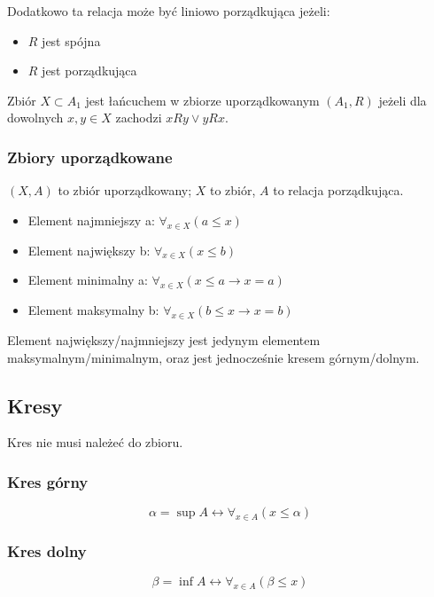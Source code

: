 \documentclass{../notatki}
\begin{document}
Dodatkowo ta relacja może być liniowo porządkująca jeżeli:

\begin{itemize}
  \item $R$ jest spójna
  \item $R$ jest porządkująca
\end{itemize}

Zbiór $X \subset A_1$ jest łańcuchem w zbiorze uporządkowanym $(A_1, R)$ jeżeli
dla dowolnych $x, y \in X$ zachodzi $xRy \lor yRx$.

\subsubsection{Zbiory uporządkowane}

$(X, A)$ to zbiór uporządkowany; $X$ to zbiór, $A$ to relacja porządkująca.

\begin{itemize}
  \item Element najmniejszy a: $\forall_{x \in X}(a \le x)$
  \item Element największy b: $\forall_{x \in X}(x \le b)$
  \item Element minimalny a: $\forall_{x \in X}(x \le a \rightarrow x = a)$
  \item Element maksymalny b: $\forall_{x \in X}(b \le x \rightarrow x = b)$
\end{itemize}

Element największy/najmniejszy jest jedynym elementem maksymalnym/minimalnym,
oraz jest jednocześnie kresem górnym/dolnym.

\subsection{Kresy}

Kres nie musi należeć do zbioru.

\subsubsection{Kres górny}

$$
\alpha = \sup A \leftrightarrow \forall_{x \in A}(x \le \alpha)
$$

\subsubsection{Kres dolny}

$$
\beta = \inf A \leftrightarrow \forall_{x \in A}(\beta \le x)
$$
\end{document}
